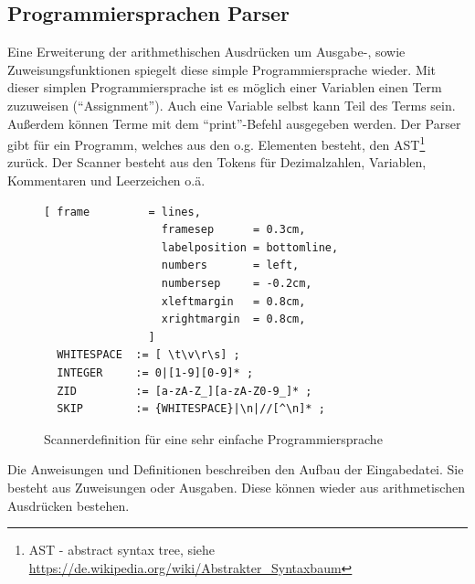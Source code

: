 \subsection{Programmiersprachen Parser}
Eine Erweiterung der arithmethischen Ausdrücken um Ausgabe-, sowie Zuweisungsfunktionen spiegelt diese simple Programmiersprache wieder. Mit dieser simplen Programmiersprache ist es möglich einer Variablen einen Term zuzuweisen ("`Assignment"'). Auch eine Variable selbst kann Teil des Terms sein. Außerdem können Terme mit dem "`print"'-Befehl ausgegeben werden.
Der Parser gibt für ein Programm, welches aus den o.g. Elementen besteht, den AST\footnote{AST - abstract syntax tree, siehe \url{https://de.wikipedia.org/wiki/Abstrakter_Syntaxbaum}} zurück.
Der Scanner  besteht aus den Tokens für Dezimalzahlen, Variablen, Kommentaren und Leerzeichen o.ä.
\begin{figure}[!htb]
\begin{Verbatim}[ frame         = lines, 
                  framesep      = 0.3cm, 
                  labelposition = bottomline,
                  numbers       = left,
                  numbersep     = -0.2cm,
                  xleftmargin   = 0.8cm,
                  xrightmargin  = 0.8cm,
                ]
  WHITESPACE  := [ \t\v\r\s] ;
  INTEGER     := 0|[1-9][0-9]* ;
  ZID         := [a-zA-Z_][a-zA-Z0-9_]* ;
  SKIP        := {WHITESPACE}|\n|//[^\n]* ;
\end{Verbatim}
\caption{Scannerdefinition für eine sehr einfache Programmiersprache}
\label{fig:example_interpreter_grammar_scanner}
\end{figure}
Die Anweisungen und Definitionen  beschreiben den Aufbau der Eingabedatei. Sie besteht aus Zuweisungen oder Ausgaben. Diese können wieder aus arithmetischen Ausdrücken bestehen.
